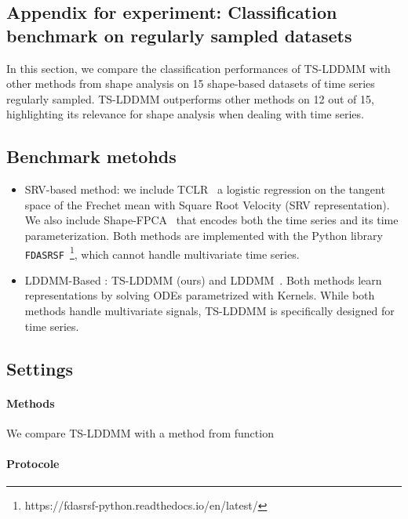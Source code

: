 \subsection{Appendix for experiment: Classification benchmark on regularly sampled datasets}

In this section, we compare the classification performances of TS-LDDMM with other methods from shape analysis on 15 shape-based datasets of time series regularly sampled. TS-LDDMM outperforms other methods on 12 out of 15, highlighting its relevance for shape analysis when dealing with time series. 


\subsection{Benchmark metohds}
\begin{itemize}
  \item SRV-based method: we include TCLR~\cite{heo2024logistic} a logistic regression on the tangent space of the Frechet mean with Square Root Velocity (SRV representation). We also include Shape-FPCA~\cite{wu2024shape} that encodes both the time series and its time parameterization. Both methods are implemented with the Python library \texttt{FDASRSF}~\footnote{https://fdasrsf-python.readthedocs.io/en/latest/}, which cannot handle multivariate time series.
  \item LDDMM-Based : TS-LDDMM (ours) and LDDMM~\cite{glaunes2008large}. Both methods learn representations by solving ODEs parametrized with Kernels. While both methods handle multivariate signals, TS-LDDMM is specifically designed for time series.
 \end{itemize}
\subsection{Settings}
\label{appendix: settings_classification}




\paragraph{Methods} We compare TS-LDDMM with a method from function~\cite{wu2024shape}

\paragraph{Protocole}

